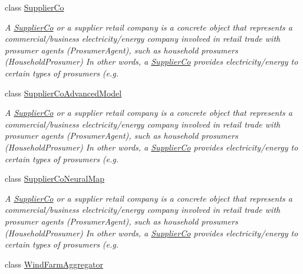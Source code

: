 \begin{DoxyCompactItemize}
\item 
class \hyperlink{classuk_1_1ac_1_1dmu_1_1iesd_1_1cascade_1_1agents_1_1aggregators_1_1_supplier_co}{Supplier\-Co}
\begin{DoxyCompactList}\small\item\em A {\itshape \hyperlink{classuk_1_1ac_1_1dmu_1_1iesd_1_1cascade_1_1agents_1_1aggregators_1_1_supplier_co}{Supplier\-Co}} or a supplier retail company is a concrete object that represents a commercial/business electricity/energy company involved in retail trade with prosumer agents ({\ttfamily Prosumer\-Agent}), such as household prosumers ({\ttfamily Household\-Prosumer}) In other words, a {\ttfamily \hyperlink{classuk_1_1ac_1_1dmu_1_1iesd_1_1cascade_1_1agents_1_1aggregators_1_1_supplier_co}{Supplier\-Co}} provides electricity/energy to certain types of prosumers (e.\-g. \end{DoxyCompactList}\item 
class \hyperlink{classuk_1_1ac_1_1dmu_1_1iesd_1_1cascade_1_1agents_1_1aggregators_1_1_supplier_co_advanced_model}{Supplier\-Co\-Advanced\-Model}
\begin{DoxyCompactList}\small\item\em A {\itshape \hyperlink{classuk_1_1ac_1_1dmu_1_1iesd_1_1cascade_1_1agents_1_1aggregators_1_1_supplier_co}{Supplier\-Co}} or a supplier retail company is a concrete object that represents a commercial/business electricity/energy company involved in retail trade with prosumer agents ({\ttfamily Prosumer\-Agent}), such as household prosumers ({\ttfamily Household\-Prosumer}) In other words, a {\ttfamily \hyperlink{classuk_1_1ac_1_1dmu_1_1iesd_1_1cascade_1_1agents_1_1aggregators_1_1_supplier_co}{Supplier\-Co}} provides electricity/energy to certain types of prosumers (e.\-g. \end{DoxyCompactList}\item 
class \hyperlink{classuk_1_1ac_1_1dmu_1_1iesd_1_1cascade_1_1agents_1_1aggregators_1_1_supplier_co_neural_map}{Supplier\-Co\-Neural\-Map}
\begin{DoxyCompactList}\small\item\em A {\itshape \hyperlink{classuk_1_1ac_1_1dmu_1_1iesd_1_1cascade_1_1agents_1_1aggregators_1_1_supplier_co}{Supplier\-Co}} or a supplier retail company is a concrete object that represents a commercial/business electricity/energy company involved in retail trade with prosumer agents ({\ttfamily Prosumer\-Agent}), such as household prosumers ({\ttfamily Household\-Prosumer}) In other words, a {\ttfamily \hyperlink{classuk_1_1ac_1_1dmu_1_1iesd_1_1cascade_1_1agents_1_1aggregators_1_1_supplier_co}{Supplier\-Co}} provides electricity/energy to certain types of prosumers (e.\-g. \end{DoxyCompactList}\item 
class \hyperlink{classuk_1_1ac_1_1dmu_1_1iesd_1_1cascade_1_1agents_1_1aggregators_1_1_wind_farm_aggregator}{Wind\-Farm\-Aggregator}
\end{DoxyCompactItemize}


